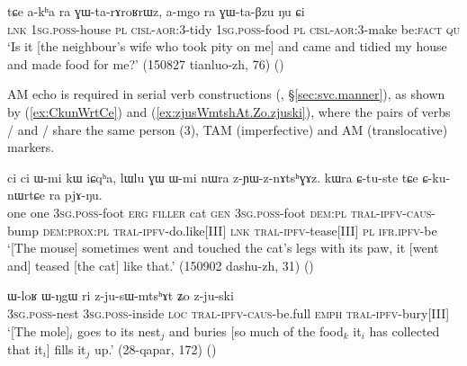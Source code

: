 \begin{exe}
\ex \label{ex:GWtaBzu}
\gll  tɕe a-kʰa ra ɣɯ-ta-rɤroʁrɯz, 	a-mgo  ra ɣɯ-ta-βzu ŋu ɕi \\
\textsc{lnk} \textsc{1sg}.\textsc{poss}-house \textsc{pl} \textsc{cisl}-\textsc{aor}:3\flobv{}-tidy 
 \textsc{1sg}.\textsc{poss}-food \textsc{pl} \textsc{cisl}-\textsc{aor}:3\flobv{}-make be:\textsc{fact} \textsc{qu} \\ 
\glt `Is it [the neighbour's wife who took pity on me] and came and tidied my house and made food for me?'  (150827 tianluo-zh, 76)
()
\end{exe}

AM echo is required in serial verb constructions (\citealt[253--255]{jacques16complementation}, §\ref{sec:svc.manner}), as shown by (\ref{ex:CkunWrtCe}) and (\ref{ex:zjusWmtshAt.Zo.zjuski}), where the pairs of verbs  /  and   /  share the same person (3\flobv{}), TAM (imperfective) and AM (translocative) markers.

\begin{exe}
\ex \label{ex:CkunWrtCe}
\gll  ci ci ɯ-mi kɯ iɕqʰa, lɯlu ɣɯ ɯ-mi nɯra z-ɲɯ-z-nɤtsʰɣɤz. kɯra ɕ-tu-ste tɕe ɕ-ku-nɯrtɕe ra pjɤ-ŋu. \\
one one \textsc{3sg}.\textsc{poss}-foot \textsc{erg} \textsc{filler} cat \textsc{gen} \textsc{3sg}.\textsc{poss}-foot \textsc{dem}:\textsc{pl} \textsc{tral}-\textsc{ipfv}-\textsc{caus}-bump  \textsc{dem}:\textsc{prox}:\textsc{pl} \textsc{tral}-\textsc{ipfv}-do.like[III] \textsc{lnk}  \textsc{tral}-\textsc{ipfv}-tease[III] \textsc{pl} \textsc{ifr}.\textsc{ipfv}-be \\
\glt `[The mouse] sometimes went and touched the cat's legs with its paw, it [went and] teased [the cat] like that.' (150902 dashu-zh, 31)
()
\end{exe} 

\begin{exe}
\ex \label{ex:zjusWmtshAt.Zo.zjuski}
\gll    ɯ-loʁ ɯ-ŋgɯ ri z-ju-sɯ-mtsʰɤt ʑo z-ju-ski \\
\textsc{3sg}.\textsc{poss}-nest \textsc{3sg}.\textsc{poss}-inside \textsc{loc} \textsc{tral}-\textsc{ipfv}-\textsc{caus}-be.full \textsc{emph} \textsc{tral}-\textsc{ipfv}-bury[III] \\
\glt `[The mole]$_i$ goes to its nest$_j$ and buries [so much of the food$_k$ it$_i$ has collected that it$_i$] fills it$_j$ up.' (28-qapar, 172)
()
\end{exe} 

